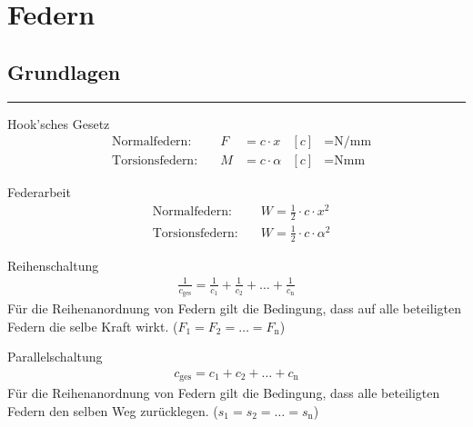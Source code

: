 \section{Federn}
\subsection{Grundlagen}

\hrule
\begin{eeqn}{Hook'sches Gesetz}
	\begin{align}
		&\text{Normalfedern:}  &\quad  F &= c\cdot x & [c] &=\text{N/mm}\\
		&\text{Torsionsfedern:}&\quad  M &= c\cdot \alpha & [c] &=\text{Nmm}
	\end{align}
\end{eeqn}

\begin{eeqn}{Federarbeit}
	\begin{align}
		&\text{Normalfedern:}  &\quad W = \frac{1}{2} \cdot c \cdot x^2 \\
		&\text{Torsionsfedern:}&\quad  W = \frac{1}{2} \cdot c \cdot \alpha^2
	\end{align}
\end{eeqn}

\begin{eeqn}{Reihenschaltung}
	\begin{align}
		\frac{1}{c_\text{ges}} = \frac{1}{c_1} + \frac{1}{c_2} + \dots + \frac{1}{c_\text{n}}
	\end{align}
	Für die Reihenanordnung von Federn gilt die Bedingung, dass auf alle beteiligten Federn die selbe Kraft wirkt. ($F_1 = F_2 = \dots = F_\text{n}$)
\end{eeqn}

\begin{eeqn}{Parallelschaltung}
	\begin{align}
		c_\text{ges} = c_1 + c_2 + \dots + c_\text{n}
	\end{align}
	Für die Reihenanordnung von Federn gilt die Bedingung, dass alle beteiligten Federn den selben Weg zurücklegen. ($s_1 = s_2 = \dots = s_\text{n}$)
\end{eeqn}

